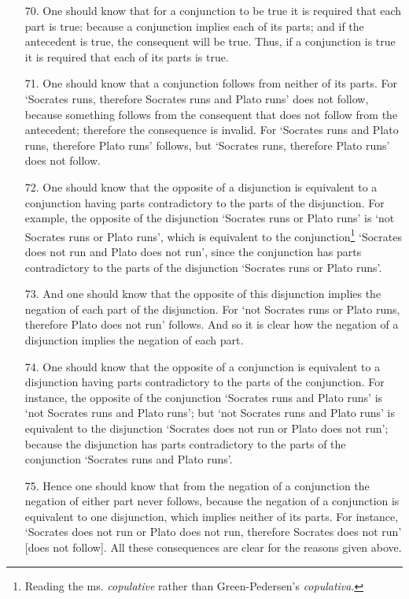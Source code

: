 \documentclass[]{article}
\begin{document}
\begin{enumerate}
\item[70.] One should know that for a conjunction to be true it is required that each part is true: because a conjunction implies each of its parts; and if the antecedent is true, the consequent will be true. Thus, if a conjunction is true it is required that each of its parts is true.
\item[71.] One should know that a conjunction follows from neither of its parts. For `Socrates runs, therefore Socrates runs and Plato runs' does not follow, because something follows from the consequent that does not follow from the antecedent; therefore the consequence is invalid. For `Socrates runs and Plato runs, therefore Plato runs' follows, but `Socrates runs, therefore Plato runs' does not follow.
\item[72.] One should know that the opposite of a disjunction is equivalent to a conjunction having parts contradictory to the parts of the disjunction. For example, the opposite of the disjunction `Socrates runs or Plato runs' is `not Socrates runs or Plato runs', which is equivalent to the conjunction\footnote{Reading the ms. \textit{copulative} rather than Green-Pedersen's \textit{copulativa}.} `Socrates does not run and Plato does not run', since the conjunction has parts contradictory to the parts of the disjunction `Socrates runs or Plato runs'.
\item[73.] And one should know that the opposite of this disjunction implies the negation of each part of the disjunction. For `not Socrates runs or Plato runs, therefore Plato does not run' follows. And so it is clear how the negation of a disjunction implies the negation of each part.
\item[74.] One should know that the opposite of a conjunction is equivalent to a disjunction having parts contradictory to the parts of the conjunction. For instance, the opposite of the conjunction `Socrates runs and Plato runs' is `not Socrates runs and Plato runs'; but `not Socrates runs and Plato runs' is equivalent to the disjunction `Socrates does not run or Plato does not run'; because the disjunction has parts contradictory to the parts of the conjunction `Socrates runs and Plato runs'.
\item[75.] Hence one should know that from the negation of a conjunction the negation of either part never follows, because the negation of a conjunction is equivalent to one disjunction, which implies neither of its parts. For instance, `Socrates does not run or Plato does not run, therefore Socrates does not run' [does not follow]. All these consequences are clear for the reasons given above.

\end{enumerate}
\end{document}

